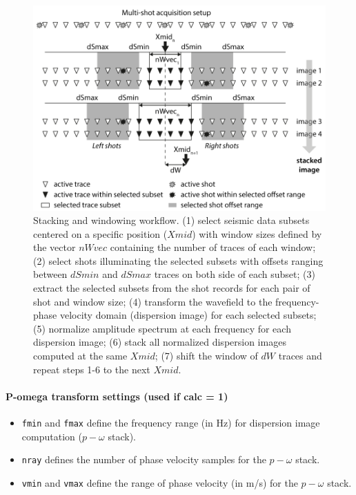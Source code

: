 \documentclass[twoside,a4paper]{article}
\begin{document}
\begin{figure}[h!]
\centerline{\includegraphics[width=0.75\linewidth]{figures/stack_wind.png}}
\caption{Stacking and windowing workflow. (1) select seismic data subsets centered on a specific position ($Xmid$) with window sizes defined by the vector $nWvec$ containing the number of traces of each window; (2) select shots illuminating the selected subsets with offsets ranging between $dSmin$ and $dSmax$ traces on both side of each subset; (3) extract the selected subsets from the shot records for each pair of shot and window size; (4) transform the wavefield to the frequency-phase velocity domain (dispersion image) for each selected subsets; (5) normalize amplitude spectrum at each frequency for each dispersion image; (6) stack all normalized dispersion images computed at the same $Xmid$; (7) shift the window of $dW$ traces and repeat steps 1-6 to the next $Xmid$.}
\label{fig:stack_wind}
\end{figure}

\paragraph{P-omega transform settings (used if calc = 1)}
\begin{itemize}[leftmargin=*]
\setlength\itemsep{2ex}
\item \verb|fmin| and \verb|fmax| define the frequency range (in Hz) for dispersion image computation ($p-\omega$ stack).

\item \verb|nray| defines the number of phase velocity samples for the $p-\omega$ stack.

\item \verb|vmin| and \verb|vmax| define the range of phase velocity (in m/s) for the $p-\omega$ stack.
\end{itemize}
\end{document}
